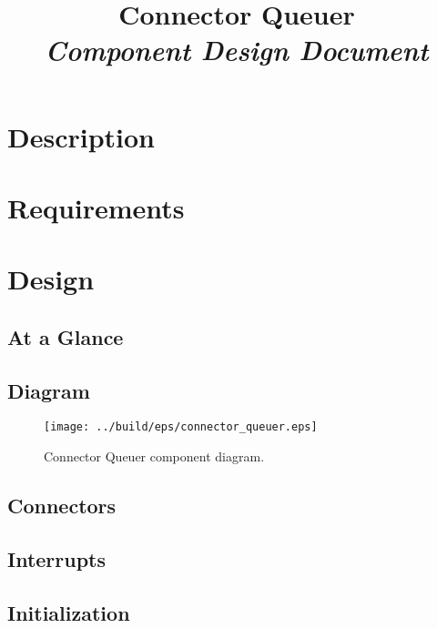 



\title{\textbf{Connector Queuer} \\
\large\textit{Component Design Document}}
\date{}
\maketitle

\section{Description}


\section{Requirements}


\section{Design}

\subsection{At a Glance}


\subsection{Diagram}
\begin{figure}[H]
  \texttt{[image: ../build/eps/connector\_queuer.eps]}
  \caption{Connector Queuer component diagram.}
\end{figure}

\subsection{Connectors}


\subsection{Interrupts}



\subsection{Initialization}


